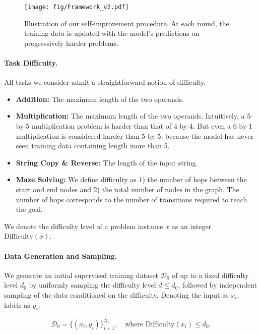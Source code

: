 \begin{figure}
    \centering
    \texttt{[image: fig/Framework\_v2.pdf]}
    \caption{Illustration of our self-improvement procedure. At each round, the training data is updated with the model's predictions on progressively harder problems. }
    \label{fig:SI_illustration}
\end{figure}

\paragraph{Task Difficulty. }
All tasks we consider admit a straightforward notion of difficulty. 

\begin{itemize}[left=10pt]
    \item \textbf{Addition: } The maximum length of the two operands.
    \item \textbf{Multiplication: } The maximum length of the two operands. Intuitively, a 5-by-5 multiplication problem is harder than that of 4-by-4. But even a 6-by-1 multiplication is considered harder than 5-by-5, because the model has never seen training data containing length more than 5.
    \item \textbf{String Copy \& Reverse: } The length of the input string. 
    \item \textbf{Maze Solving: } We define difficulty as 1) the number of hops between the start and end nodes and 2) the total number of nodes in the graph. The number of hops corresponds to the number of transitions required to reach the goal. 
\end{itemize}

We denote the difficulty level of a problem instance $x$ as an integer $\text{Difficulty}(x)$. 



\paragraph{Data Generation and Sampling. }
We generate an initial supervised training dataset $\mathcal{D}_0$ of up to a fixed difficulty level $d_0$ by uniformly sampling the difficulty level $d \leq d_0$, followed by independent sampling of the data conditioned on the difficulty. Denoting the input as $x_i$, labels as $y_i$,



\begin{align*}
    \mathcal{D}_0=\{(x_i,y_i)\}_{i=1}^{N_0},\quad\text{where 
 }\text{Difficulty}(x_i)\leq d_0. 
\end{align*}


